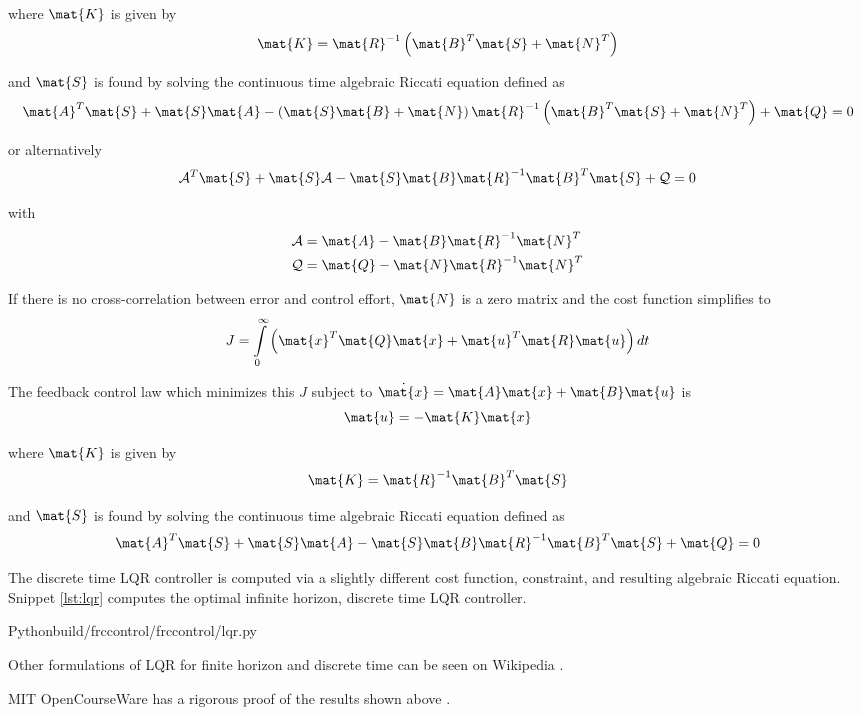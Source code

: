 where $\mat{K}$ is given by
\begin{equation*}
  \mat{K} = \mat{R}^{-1} \left(\mat{B}^T\mat{S} + \mat{N}^T\right)
\end{equation*}

and $\mat{S}$ is found by solving the continuous time algebraic Riccati equation
defined as
\begin{equation*}
  \mat{A}^T\mat{S} + \mat{S}\mat{A} - \left(\mat{S}\mat{B} +
    \mat{N}\right) \mat{R}^{-1} \left(\mat{B}^T\mat{S} + \mat{N}^T\right) +
    \mat{Q} = 0
\end{equation*}

or alternatively
\begin{equation*}
  \mathcal{A}^T\mat{S} + \mat{S}\mathcal{A} -
    \mat{S}\mat{B}\mat{R}^{-1}\mat{B}^T\mat{S} + \mathcal{Q} = 0
\end{equation*}

with
\begin{align*}
  \mathcal{A} &= \mat{A} - \mat{B}\mat{R}^{-1}\mat{N}^T \\
  \mathcal{Q} &= \mat{Q} - \mat{N}\mat{R}^{-1}\mat{N}^T
\end{align*}

If there is no cross-correlation between \gls{error} and \gls{control effort},
$\mat{N}$ is a zero matrix and the cost function simplifies to
\begin{equation*}
  J = \int\limits_0^\infty
    \left(\mat{x}^T\mat{Q}\mat{x} + \mat{u}^T\mat{R}\mat{u}\right) dt
\end{equation*}

The feedback \gls{control law} which minimizes this $J$ subject to
$\dot{\mat{x}} = \mat{A}\mat{x} + \mat{B}\mat{u}$ is
\begin{equation*}
  \mat{u} = -\mat{K}\mat{x}
\end{equation*}

where $\mat{K}$ is given by
\begin{equation*}
  \mat{K} = \mat{R}^{-1}\mat{B}^T\mat{S}
\end{equation*}

and $\mat{S}$ is found by solving the continuous time algebraic Riccati equation
defined as
\begin{equation*}
  \mat{A}^T\mat{S} + \mat{S}\mat{A} -
    \mat{S}\mat{B}\mat{R}^{-1}\mat{B}^T\mat{S} + \mat{Q} = 0
\end{equation*}

The discrete time LQR \gls{controller} is computed via a slightly different cost
function, constraint, and resulting algebraic Riccati equation. Snippet
\ref{lst:lqr} computes the optimal infinite horizon, discrete time LQR
\gls{controller}.
\begin{code}{Python}{build/frccontrol/frccontrol/lqr.py}
  \caption{Infinite horizon, discrete time LQR computation in Python}
  \label{lst:lqr}
\end{code}

Other formulations of LQR for finite horizon and discrete time can be seen on
Wikipedia \cite{bib:wiki_lqr}.

MIT OpenCourseWare has a rigorous proof of the results shown above
\cite{bib:lqr_derivs}.
